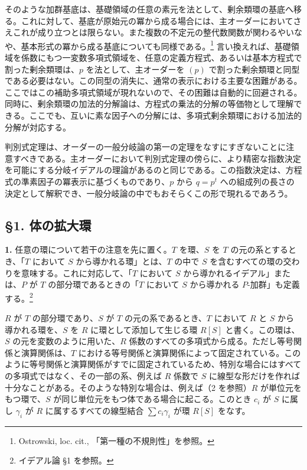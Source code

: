 \documentclass[11pt]{article}
\begin{document}
そのような加群基底は、基礎領域の任意の素元を法として、剰余類環の基底へ移る。これに対して、基底が原始元の冪から成る場合には、主オーダーにおいてさえこれが成り立つとは限らない。また複数の不定元の整代数関数が関わるやいなや、基本形式の冪から成る基底についても同様である。\footnote{Ostrowski, loc. cit., 「第一種の不規則性」を参照。} 言い換えれば、基礎領域を係数にもつ一変数多項式領域を、任意の定義方程式、あるいは基本方程式で割った剰余類環は、$p$ を法として、主オーダーを $(p)$ で割った剰余類環と同型である必要はない。この同型の消失に、通常の表示における主要な困難がある。ここではこの補助多項式領域が現れないので、その困難は自動的に回避される。同時に、剰余類環の加法的分解論は、方程式の乗法的分解の等価物として理解できる。ここでも、互いに素な因子への分解には、多項式剰余類環における加法的分解が対応する。

判別式定理は、オーダーの一般分岐論の第一の定理をなすにすぎないことに注意すべきである。主オーダーにおいて判別式定理の傍らに、より精密な指数決定を可能にする分岐イデアルの理論があるのと同じである。この指数決定は、方程式の準素因子の冪表示に基づくものであり、$p$ から $q=p^t$ への組成列の長さの決定として解釈でき、一般分岐論の中でもおそらくこの形で現れるであろう。

\subsection*{\S 1. 体の拡大環}

\textbf{1.} 任意の環について若干の注意を先に置く。$T$ を環、$S$ を $T$ の元の系とするとき、「$T$ において $S$ から導かれる環」とは、$T$ の中で $S$ を含むすべての環の交わりを意味する。これに対応して、「$T$ において $S$ から導かれるイデアル」または、$P$ が $T$ の部分環であるときの「$T$ において $S$ から導かれる $P$-加群」も定義する。\footnote{イデアル論 \S 1 を参照。}

$R$ が $T$ の部分環であり、$S$ が $T$ の元の系であるとき、$T$ において $R$ と $S$ から導かれる環を、$S$ を $R$ に環として添加して生じる環 $R[S]$ と書く。この環は、$S$ の元を変数のように用いた、$R$ 係数のすべての多項式から成る。ただし等号関係と演算関係は、$T$ における等号関係と演算関係によって固定されている。このように等号関係と演算関係がすでに固定されているため、特別な場合にはすべての多項式ではなく、その一部の系、例えば $R$ 係数で $S$ に線型な形だけを作れば十分なことがある。そのような特別な場合は、例えば（2 を参照）$R$ が単位元をもつ環で、$S$ が同じ単位元をもつ体である場合に起こる。このとき $c_i$ が $S$ に属し $\gamma_i$ が $R$ に属するすべての線型結合 $\sum c_i\gamma_i$ が環 $R[S]$ をなす。
\end{document}
